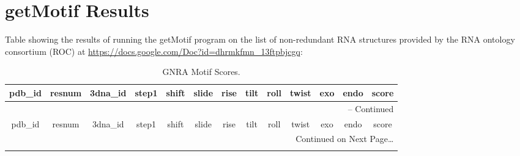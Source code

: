 \chapter{getMotif Results}
\label{appendix5a}

Table showing the results of  running the getMotif program on the list
of  non-redundant   RNA  structures  provided  by   the  RNA  ontology
consortium (ROC) at \url{https://docs.google.com/Doc?id=dhrmkfmn_13ftpbjcgq}: 

\footnotesize{
\begin{center}
\begin{longtable}{|c|c|c|c|c|c|c|c|c|c|c|c|c|}
\caption{GNRA Motif Scores.}
\label{tab:gnrascores}\\
\hline
pdb\_id & resnum & 3dna\_id & step1 &  shift & slide & rise & tilt & roll
& twist & exo & endo & score \\ \hline \hline
\endfirsthead

\multicolumn{13}{r}{{\tablename} \thetable{} -- Continued} \\
\hline
pdb\_id & resnum & 3dna\_id & step1 &  shift & slide & rise & tilt & roll
& twist & exo & endo & score \\ \hline \hline


\endhead

\multicolumn{13}{r}{Continued on Next Page\ldots} \\
\endfoot
\endlastfoot


\end{longtable}
\end{center}}

